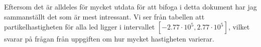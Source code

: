 \documentclass[a4paper]{article}
\begin{document}
Eftersom det är alldeles för mycket utdata för att bifoga i detta dokument har
jag sammanställt det som är mest intressant. Vi ser från tabellen att partikelhastigheten för alla led ligger i intervallet
$[-2.77 \cdot 10^5, 2.77 \cdot 10^5]$, vilket svarar på frågan från uppgiften om
hur mycket hastigheten varierar.


\end{document}
